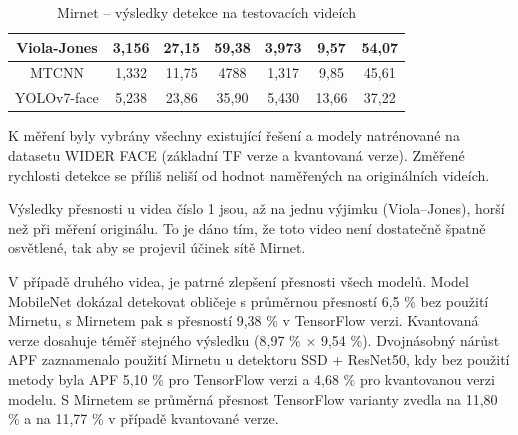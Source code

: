 \begin{table}[H]
\begin{tabular}{c|ccc|ccc|}
  \multicolumn{1}{|c|}{\cellcolor[HTML]{E0DBDB}Viola-Jones}                  & \multicolumn{1}{c|}{3,156}                                  & \multicolumn{1}{c|}{27,15}                                  & 59,38          & \multicolumn{1}{c|}{3,973}                                  & \multicolumn{1}{c|}{9,57}                                   & 54,07          \\ \hline
  \multicolumn{1}{|c|}{\cellcolor[HTML]{E0DBDB}MTCNN}                        & \multicolumn{1}{c|}{1,332}                                  & \multicolumn{1}{c|}{11,75}                                  & 4788           & \multicolumn{1}{c|}{1,317}                                  & \multicolumn{1}{c|}{9,85}                                   & 45,61          \\ \hline
  \multicolumn{1}{|c|}{\cellcolor[HTML]{E0DBDB}YOLOv7-face}                  & \multicolumn{1}{c|}{5,238}                                  & \multicolumn{1}{c|}{23,86}                                  & 35,90          & \multicolumn{1}{c|}{5,430}                                  & \multicolumn{1}{c|}{13,66}                                  & 37,22          \\ \hline
  \end{tabular}
  \label{tabulka:mirnet}
  \caption{Mirnet -- výsledky detekce na testovacích videích}
\end{table}


K měření byly vybrány všechny existující řešení a modely natrénované na datasetu WIDER FACE (základní TF verze a kvantovaná verze). Změřené rychlosti detekce se příliš neliší od hodnot naměřených na originálních videích. 

Výsledky přesnosti u videa číslo 1 jsou, až na jednu výjimku (Viola--Jones), horší než při měření originálu. To je dáno tím, že toto video není dostatečně špatně osvětlené, tak aby se projevil účinek sítě Mirnet. 

V případě druhého videa, je patrné zlepšení přesnosti všech modelů. Model MobileNet dokázal detekovat obličeje s průměrnou přesností 6,5 \% bez použití Mirnetu, s Mirnetem pak s přesností 9,38 \% v TensorFlow verzi. Kvantovaná verze dosahuje téměř stejného výsledku (8,97 \% $\times$ 9,54 \%). Dvojnásobný nárůst APF zaznamenalo použití Mirnetu u detektoru SSD + ResNet50, kdy bez použití metody byla APF 5,10 \% pro TensorFlow verzi a 4,68 \% pro kvantovanou verzi modelu. S Mirnetem se průměrná přesnost TensorFlow varianty zvedla na 11,80 \% a na 11,77 \% v případě kvantované verze.

